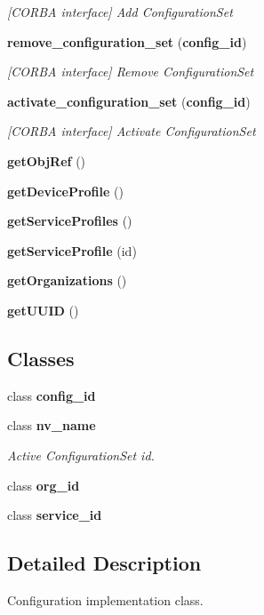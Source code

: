 \begin{CompactItemize}
\begin{CompactList}\small\item\em [CORBA interface] Add Configuration\-Set \item\end{CompactList}\item 
{\bf remove\_\-configuration\_\-set} ({\bf config\_\-id})
\begin{CompactList}\small\item\em [CORBA interface] Remove Configuration\-Set \item\end{CompactList}\item 
{\bf activate\_\-configuration\_\-set} ({\bf config\_\-id})
\begin{CompactList}\small\item\em [CORBA interface] Activate Configuration\-Set \item\end{CompactList}\item 
{\bf get\-Obj\-Ref} ()
\item 
{\bf get\-Device\-Profile} ()
\item 
{\bf get\-Service\-Profiles} ()
\item 
{\bf get\-Service\-Profile} (id)
\item 
{\bf get\-Organizations} ()
\item 
{\bf get\-UUID} ()
\end{CompactItemize}
\subsection*{Classes}
\begin{CompactItemize}
\item 
class {\bf config\_\-id}
\item 
class {\bf nv\_\-name}
\begin{CompactList}\small\item\em Active Configuration\-Set id. \item\end{CompactList}\item 
class {\bf org\_\-id}
\item 
class {\bf service\_\-id}
\end{CompactItemize}


\subsection{Detailed Description}
Configuration implementation class. 

